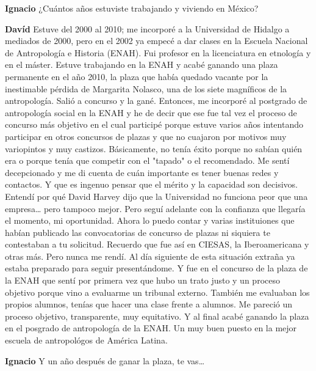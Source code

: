 \documentclass[
  spanish,
  11pt,
  a4paper,
]{scrbook}
\newenvironment{transcripcion}{
    \begin{list}{}{
        \setlength{\leftmargin}{1.5em}  %
        \setlength{\rightmargin}{0em}
        \setlength{\itemsep}{0.2em}     %
        \setlength{\parsep}{0.0em}
        \setlength{\listparindent}{0pt}
    }
}{
    \end{list}
}
\newcommand{\personaje}[1]{\textbf{#1}\quad}
\begin{document}
\begin{transcripcion}
\item \personaje{Ignacio} ¿Cuántos años estuviste trabajando y viviendo en México?

\item \personaje{Davíd} Estuve del 2000 al 2010; me incorporé a la Universidad de Hidalgo a mediados de 2000, pero en el 2002 ya empecé a dar clases en la Escuela Nacional de Antropología e Historia (ENAH). Fui profesor en la licenciatura en etnología y en el máster. Estuve trabajando en la ENAH y acabé ganando una plaza permanente en el año 2010, la plaza que había quedado vacante por la inestimable pérdida de Margarita Nolasco, una de los siete magníficos de la antropología. Salió a concurso y la gané. Entonces, me incorporé al postgrado de antropología social en la ENAH y he de decir que ese fue tal vez el proceso de concurso más objetivo en el cual participé porque estuve varios años intentando participar en otros concursos de plazas y que no cuajaron por motivos muy variopintos y muy castizos. Básicamente, no tenía éxito porque no sabían quién era o porque tenía que competir con el "tapado" o el recomendado. Me sentí decepcionado y me di cuenta de cuán importante es tener buenas redes y contactos. Y que es ingenuo pensar que el mérito y la capacidad son decisivos. Entendí por qué David Harvey dijo que la Universidad no funciona peor que una empresa… pero tampoco mejor. Pero seguí adelante con la confianza que llegaría el momento, mi oportunidad. Ahora lo puedo contar y varias instituiones que habían publicado las convocatorias de concurso de plazas ni siquiera te contestaban a tu solicitud. Recuerdo que fue así en CIESAS, la Iberoamericana y otras más. Pero nunca me rendí. Al día siguiente de esta situación extraña ya estaba preparado para seguir presentándome. Y fue en el concurso de la plaza de la ENAH que sentí por primera vez que hubo un trato justo y un proceso objetivo porque vino a evaluarme un tribunal externo. También me evaluaban los propios alumnos, tenías que hacer una clase frente a alumnos. Me pareció un proceso objetivo, transparente, muy equitativo. Y al final acabé ganando la plaza en el posgrado de antropología de la ENAH. Un muy buen puesto en la mejor escuela de antropológos de América Latina.

\item \personaje{Ignacio} Y un año después de ganar la plaza, te vas…


\end{transcripcion}
\end{document}

